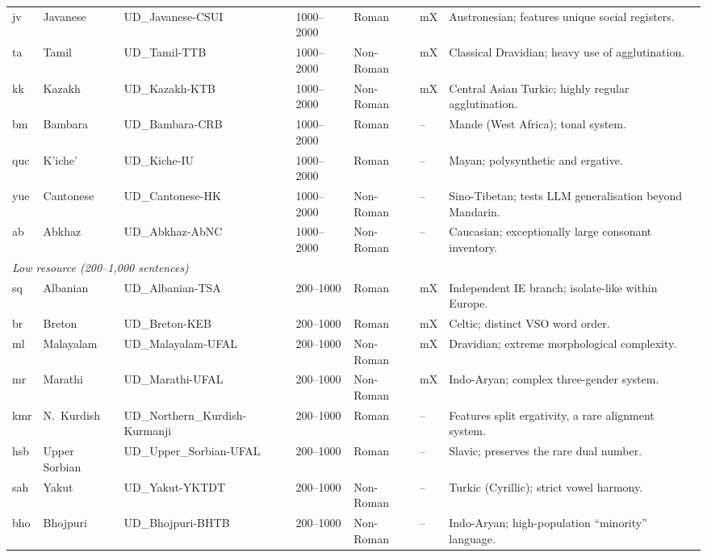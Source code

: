 \begin{table}[ht]
\begin{tabular}{llllllp{6.2cm}}
jv  & Javanese      & UD\_Javanese-CSUI         & 1000--2000 & Roman     & mX & Austronesian; features unique social registers. \\
ta  & Tamil         & UD\_Tamil-TTB             & 1000--2000 & Non-Roman & mX & Classical Dravidian; heavy use of agglutination. \\
kk  & Kazakh        & UD\_Kazakh-KTB            & 1000--2000 & Non-Roman & mX & Central Asian Turkic; highly regular agglutination. \\
bm  & Bambara       & UD\_Bambara-CRB           & 1000--2000 & Roman     & -- & Mande (West Africa); tonal system. \\
quc & K'iche'       & UD\_Kiche-IU              & 1000--2000 & Roman     & -- & Mayan; polysynthetic and ergative. \\
yue & Cantonese     & UD\_Cantonese-HK          & 1000--2000 & Non-Roman & -- & Sino-Tibetan; tests LLM generalisation beyond Mandarin. \\
ab  & Abkhaz        & UD\_Abkhaz-AbNC           & 1000--2000 & Non-Roman & -- & Caucasian; exceptionally large consonant inventory. \\
\midrule
\multicolumn{7}{l}{\textit{Low resource (200--1{,}000 sentences)}} \\
\midrule
sq  & Albanian      & UD\_Albanian-TSA          & 200--1000 & Roman     & mX & Independent IE branch; isolate-like within Europe. \\
br  & Breton        & UD\_Breton-KEB            & 200--1000 & Roman     & mX & Celtic; distinct VSO word order. \\
ml  & Malayalam     & UD\_Malayalam-UFAL        & 200--1000 & Non-Roman & mX & Dravidian; extreme morphological complexity. \\
mr  & Marathi       & UD\_Marathi-UFAL          & 200--1000 & Non-Roman & mX & Indo-Aryan; complex three-gender system. \\
kmr & N.\ Kurdish   & UD\_Northern\_Kurdish-Kurmanji & 200--1000 & Roman & -- & Features split ergativity, a rare alignment system. \\
hsb & Upper Sorbian & UD\_Upper\_Sorbian-UFAL   & 200--1000 & Roman     & -- & Slavic; preserves the rare dual number. \\
sah & Yakut         & UD\_Yakut-YKTDT           & 200--1000 & Non-Roman & -- & Turkic (Cyrillic); strict vowel harmony. \\
bho & Bhojpuri      & UD\_Bhojpuri-BHTB         & 200--1000 & Non-Roman & -- & Indo-Aryan; high-population ``minority'' language. \\
\bottomrule
\end{tabular}
\end{table}